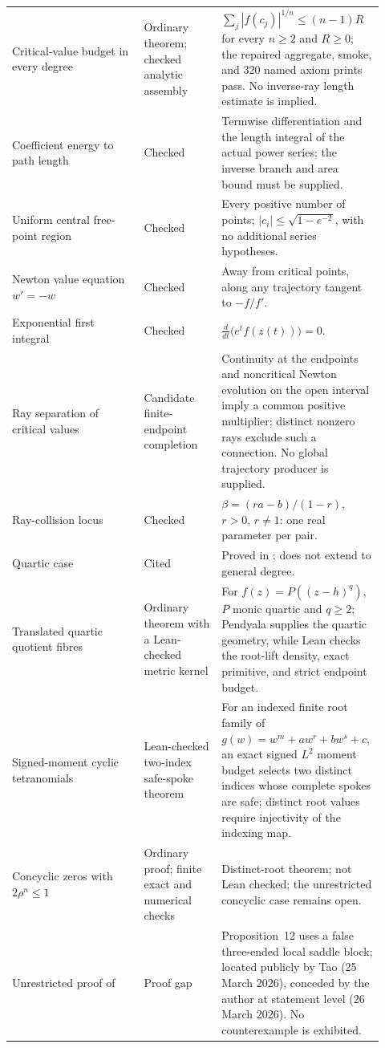 \begin{longtable}{@{}
  >{\raggedright\arraybackslash}p{0.34\linewidth}
  >{\raggedright\arraybackslash}p{0.20\linewidth}
  >{\raggedright\arraybackslash}p{0.38\linewidth}@{}}
Critical-value budget in every degree & Ordinary theorem; checked analytic assembly & $\sum_j|f(c_j)|^{1/n}\le(n-1)R$ for every $n\ge2$ and $R\ge0$; the repaired aggregate, smoke, and 320 named axiom prints pass. No inverse-ray length estimate is implied. \\
Coefficient energy to path length & Checked & Termwise differentiation and the length integral of the actual power series; the inverse branch and area bound must be supplied. \\
Uniform central free-point region & Checked & Every positive number of points; $|c_i|\le\sqrt{1-e^{-2}}$, with no additional series hypotheses. \\
Newton value equation $w'=-w$ & Checked & Away from critical points, along any trajectory tangent to $-f/f'$. \\
Exponential first integral & Checked & $\tfrac{d}{dt}\bigl(e^{t}f(z(t))\bigr)=0$. \\
Ray separation of critical values & Candidate finite-endpoint completion & Continuity at the endpoints and noncritical Newton evolution on the open interval imply a common positive multiplier; distinct nonzero rays exclude such a connection. No global trajectory producer is supplied. \\
Ray-collision locus & Checked & $\beta=(ra-b)/(1-r)$, $r>0$, $r\ne1$: one real parameter per pair. \\
Quartic case & Cited & Proved in \cite[Thm.~1, p.~1]{june2026}; does not extend to general degree. \\
Translated quartic quotient fibres & Ordinary theorem with a Lean-checked metric kernel & For $f(z)=P((z-h)^q)$, $P$ monic quartic and $q\ge2$; Pendyala supplies the quartic geometry, while Lean checks the root-lift density, exact primitive, and strict endpoint budget. \\
Signed-moment cyclic tetranomials & Lean-checked two-index safe-spoke theorem & For an indexed finite root family of $g(w)=w^m+aw^r+bw^s+c$, an exact signed $L^2$ moment budget selects two distinct indices whose complete spokes are safe; distinct root values require injectivity of the indexing map. \\
Concyclic zeros with $2\rho^n\le1$ & Ordinary proof; finite exact and numerical checks & Distinct-root theorem; not Lean checked; the unrestricted concyclic case remains open. \\
Unrestricted proof of \cite[Theorem~1, p.~1]{march2026} & Proof gap & Proposition~12 uses a false three-ended local saddle block; located publicly by Tao (25 March 2026), conceded by the author at statement level (26 March 2026).  No counterexample is exhibited. \\

\end{longtable}
